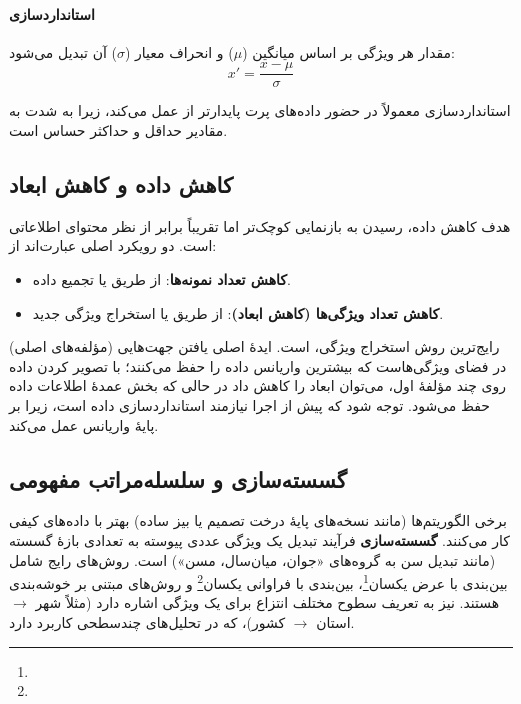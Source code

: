 \paragraph{استانداردسازی }
مقدار هر ویژگی بر اساس میانگین ($\mu$) و انحراف معیار ($\sigma$) آن
تبدیل می‌شود:
\[
x' = \frac{x - \mu}{\sigma}
\]

استانداردسازی  معمولاً در حضور داده‌های پرت پایدارتر از
 عمل می‌کند، زیرا  به شدت به مقادیر حداقل و حداکثر
حساس است.

\subsection{کاهش داده و کاهش ابعاد}

هدف کاهش داده، رسیدن به بازنمایی کوچک‌تر اما تقریباً برابر از نظر محتوای
اطلاعاتی است. دو رویکرد اصلی عبارت‌اند از:

\begin{itemize}
    \item \textbf{کاهش تعداد نمونه‌ها}: از طریق  یا
          تجمیع داده.
    \item \textbf{کاهش تعداد ویژگی‌ها (کاهش ابعاد)}: از طریق
           یا
          استخراج ویژگی جدید.
\end{itemize}

رایج‌ترین روش استخراج ویژگی، 
است. ایدهٔ اصلی  یافتن جهت‌هایی (مؤلفه‌های اصلی) در فضای ویژگی‌هاست که
بیشترین واریانس داده را حفظ می‌کنند؛ با تصویر کردن داده روی چند مؤلفهٔ اول،
می‌توان ابعاد را کاهش داد در حالی که بخش عمدهٔ اطلاعات داده حفظ می‌شود. توجه
شود که  پیش از اجرا نیازمند استانداردسازی داده است، زیرا بر پایهٔ
واریانس عمل می‌کند.

\subsection{گسسته‌سازی و سلسله‌مراتب مفهومی}
\label{subsec:discretization}

برخی الگوریتم‌ها (مانند نسخه‌های پایهٔ درخت تصمیم یا بیز ساده) بهتر با
داده‌های کیفی کار می‌کنند. \textbf{گسسته‌سازی} فرآیند تبدیل یک ویژگی عددی
پیوسته به تعدادی بازهٔ گسسته (مانند تبدیل سن به گروه‌های «جوان، میان‌سال،
مسن») است. روش‌های رایج شامل بین‌بندی با عرض یکسان\footnote{}،
بین‌بندی با فراوانی یکسان\footnote{} و روش‌های مبتنی بر
خوشه‌بندی هستند.
 نیز به تعریف سطوح مختلف
انتزاع برای یک ویژگی اشاره دارد (مثلاً شهر $\to$ استان $\to$ کشور)، که در
تحلیل‌های چندسطحی کاربرد دارد.

